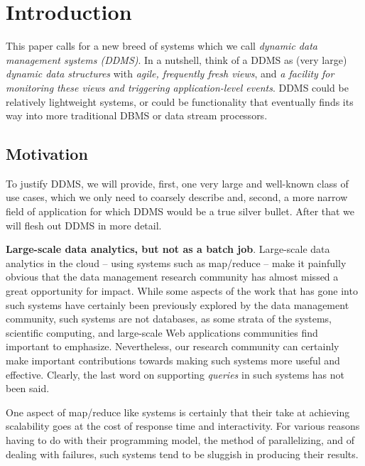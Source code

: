 

\section{Introduction}


This paper calls for a new breed of systems which
we call {\em dynamic data management systems (DDMS)}. In a nutshell,
think of a DDMS as (very large) {\em dynamic data structures}\/ with {\em agile, frequently fresh views}\/, and {\em a facility for monitoring these views and triggering applica\-tion-level events}\/. DDMS could be relatively lightweight systems, or could be functionality that eventually finds its way into more traditional DBMS or data stream processors.


\subsection{Motivation}


To justify DDMS, we will provide, first, one very large and well-known class of use cases, which we only need to coarsely describe and,
second, a more narrow field of application for which DDMS would be a true silver bullet. After that we will flesh out DDMS in more detail.

\medskip


{\bf Large-scale data analytics, but not as a batch job}\/.
%
Large-scale data analytics in the cloud -- using systems such as map/reduce -- make it painfully obvious that the data management research community has almost missed a great opportunity for impact.
While some aspects of the work that has gone into such systems have certainly been previously explored by the data management community, such systems are not databases, as some strata of the systems, scientific computing, and large-scale Web applications communities find important to emphasize. Nevertheless, our research community can certainly make important contributions towards making such systems more useful and effective. Clearly, the last word on supporting {\em queries}\/ in such systems has not been said.

One aspect of map/reduce like systems is certainly that their take at achieving scalability goes at the cost of response time and interactivity. For various reasons having to do with their programming model, the method of parallelizing, and of dealing with failures, such systems tend to be sluggish in producing their results. 

